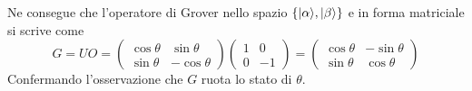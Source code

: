 \documentclass[12pt, a4paper]{report}
\begin{document}
Ne consegue che l'operatore di Grover nello spazio $\{| \alpha \rangle,| \beta \rangle\}$ e in forma matriciale si scrive come
\begin{equation*}
    G = UO =
    \begin{pmatrix}
        \cos\theta & \sin\theta \\
        \sin\theta & -\cos\theta
    \end{pmatrix}
    \begin{pmatrix}
        1 & 0 \\
        0 & -1
    \end{pmatrix} =
    \begin{pmatrix}
        \cos\theta & -\sin\theta \\
        \sin\theta & \cos\theta
    \end{pmatrix}
\end{equation*}
Confermando l'osservazione che $G$ ruota lo stato di $\theta$.
\end{document}
